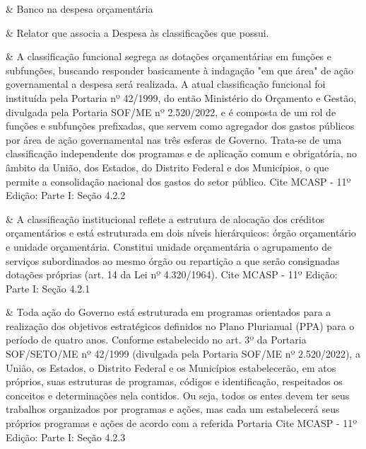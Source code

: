 &
Banco na despesa orçamentária 
\\ \hline

 &
Relator que associa a Despesa às classificações que possui. 
\\ \hline

 &
A classificação funcional segrega as dotações orçamentárias em funções e subfunções, buscando responder basicamente à indagação "em que área" de ação governamental a despesa será realizada. A atual classificação funcional foi instituída pela Portaria nº 42/1999, do então Ministério do Orçamento e Gestão, divulgada pela Portaria SOF/ME nº 2.520/2022, e é composta de um rol de funções e subfunções prefixadas, que servem como agregador dos gastos públicos por área de ação governamental nas três esferas de Governo. Trata-se de uma classificação independente dos programas e de aplicação comum e obrigatória, no âmbito da União, dos Estados, do Distrito Federal e dos Municípios, o que permite a consolidação nacional dos gastos do setor público. Cite MCASP - 11º Edição: Parte I: Seção 4.2.2 
\\ \hline

 &
A classificação institucional reflete a estrutura de alocação dos créditos orçamentários e está estruturada em dois níveis hierárquicos: órgão orçamentário e unidade orçamentária. Constitui unidade orçamentária o agrupamento de serviços subordinados ao mesmo órgão ou repartição a que serão consignadas dotações próprias (art. 14 da Lei nº 4.320/1964). Cite MCASP - 11º Edição: Parte I: Seção 4.2.1 
\\ \hline

 &
Toda ação do Governo está estruturada em programas orientados para a realização dos objetivos estratégicos definidos no Plano Plurianual (PPA) para o período de quatro anos. Conforme estabelecido no art. 3º da Portaria SOF/SETO/ME nº 42/1999 (divulgada pela Portaria SOF/ME nº 2.520/2022), a União, os Estados, o Distrito Federal e os Municípios estabelecerão, em atos próprios, suas estruturas de programas, códigos e identificação, respeitados os conceitos e determinações nela contidos. Ou seja, todos os entes devem ter seus trabalhos organizados por programas e ações, mas cada um estabelecerá seus próprios programas e ações de acordo com a referida Portaria Cite MCASP - 11º Edição: Parte I: Seção 4.2.3 
\\ \hline

